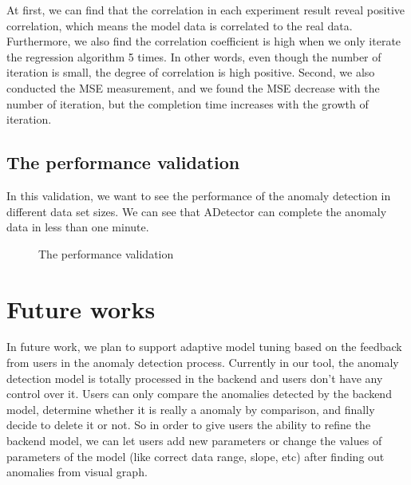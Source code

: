 \documentclass{vgtc}                          %
\begin{document}
At first, we can find that the correlation in each experiment result reveal positive correlation, which means the model data is correlated to the real data. Furthermore, we also find the correlation coefficient is high when we only iterate the regression algorithm 5 times. In other words, even though the number of iteration is small, the degree of correlation is high positive. Second, we also conducted the MSE measurement, and we found the MSE decrease with the number of iteration, but the completion time increases with the growth of iteration.
	
\subsection{The performance validation}
In this validation, we want to see the performance of the anomaly detection in different data set sizes. We can see that ADetector can complete the anomaly data in less than one minute. 

\begin{figure}[htb]
\begin{center}
\end{center}
	\caption{The performance validation}
	\label{fig:perfValid}
\end{figure} 

\section{Future works}
In future work, we plan to support adaptive model tuning based on the feedback from users in the anomaly detection process. Currently in our tool, the anomaly detection model is totally processed in the backend and users don't have any control over it. Users can only compare the anomalies detected by the backend model, determine whether it is really a anomaly by comparison, and finally decide to delete it or not. So in order to give users the ability to refine the backend model, we can let users add new parameters or change the values of parameters of the model (like correct data range, slope, etc) after finding out anomalies from visual graph.
\end{document}
